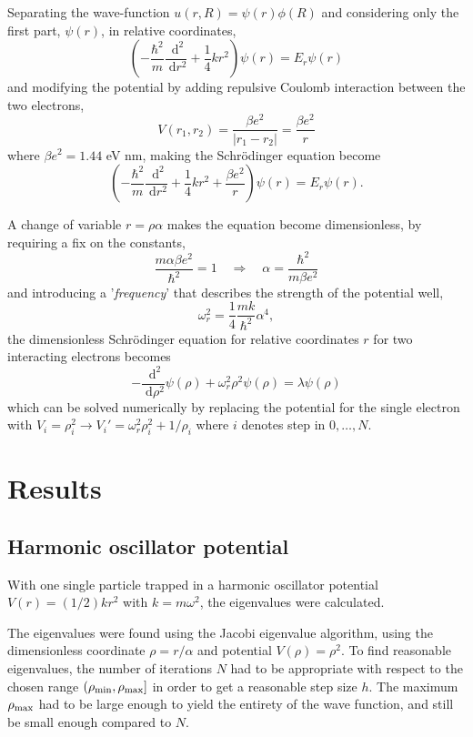 \documentclass[a4paper,11pt]{article}
\newcommand{\diff}{\ensuremath{\; \text{d}}}
\begin{document}
Separating the wave-function $u(r,R) = \psi(r) \phi(R)$ and considering only the first part, $\psi(r)$, in relative coordinates, 
\[ \left( -\frac{\hbar^2}{m} \frac{\diff^2}{\diff r^2} + \frac{1}{4} kr^2 \right) \psi(r) = E_r \psi(r) \]
and modifying the potential by adding repulsive Coulomb interaction between the two electrons,
\[ V(r_1, r_2) = \frac{\beta e^2}{|r_1 - r_2 |} = \frac{\beta e^2}{r} \]
where $\beta e^2 = 1.44$ eV nm, making the Schr\"{o}dinger equation become
\[ \left( -\frac{\hbar^2}{m} \frac{\diff^2}{\diff r^2} + \frac{1}{4} kr^2 + \frac{\beta e^2}{r} \right) \psi(r) = E_r \psi(r). \]

A change of variable $r =\rho\alpha$ makes the equation become dimensionless, by requiring a fix on the constants,
\[ \frac{m\alpha \beta e^2}{\hbar^2} = 1 \quad \Rightarrow \quad \alpha = \frac{\hbar^2}{m \beta e^2} \]
and introducing a '\textit{frequency}' that describes the strength of the potential well,
\[ \omega_r^2 = \frac{1}{4} \frac{mk}{\hbar^2} \alpha^4, \]
the dimensionless Schr\"{o}dinger equation for relative coordinates $r$ for two interacting electrons becomes
\begin{equation}
    -\frac{\diff^2}{\diff \rho^2} \psi (\rho) + \omega_r^2 \rho^2 \psi(\rho) = \lambda \psi(\rho)
    \label{eq:se_2electrons}
\end{equation}
which can be solved numerically by replacing the potential for the single electron with $V_i = \rho_i^2 \to V_i' = \omega_r^2 \rho_i^2 + 1/\rho_i$ where $i$ denotes step in $0,\dots,N$. 

\section{Results}
\subsection{Harmonic oscillator potential}
With one single particle trapped in a harmonic oscillator potential $V(r) = (1/2) kr^2$ with $k= m \omega^2$, the eigenvalues were calculated.

The eigenvalues were found using the Jacobi eigenvalue algorithm, using the dimensionless coordinate $\rho = r/\alpha$ and potential $V(\rho) = \rho^2$. To find reasonable eigenvalues, the number of iterations $N$ had to be appropriate with respect to the chosen range $(\rho_{\rm min}, \rho_{\rm max}]$ in order to get a reasonable step size $h$. The maximum $\rho_{\rm max}$ had to be large enough to yield the entirety of the wave function, and still be small enough compared to $N$.
\end{document}
